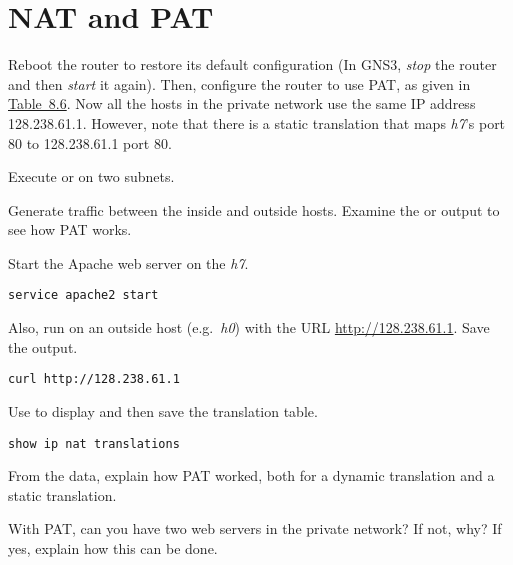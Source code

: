 \documentclass{../UTNetLab}
\begin{document}
\section{NAT and PAT}
Reboot the router to restore its default configuration (In GNS3, \textit{stop} the router and then \textit{start} it again).
Then, configure the router to use PAT, as given in \hyperref[tab:8.6]{Table~8.6}.
Now all the hosts in the private network use the same IP address 128.238.61.1.
However, note that there is a static translation that maps \textit{h7}’s port 80 to 128.238.61.1 port 80.

Execute  or  on two subnets.

Generate traffic between the inside and outside hosts.
Examine the  or  output to see how PAT works.

Start the Apache web server on the \textit{h7}.

\begin{lstlisting}
service apache2 start
\end{lstlisting}

Also, run  on an outside host (e.g.\ \textit{h0}) with the URL \url{http://128.238.61.1}.
Save the  output.

\begin{lstlisting}
curl http://128.238.61.1
\end{lstlisting}

Use  to display and then save the translation table.

\begin{lstlisting}[language=cisco, frame=trBL]
show ip nat translations
\end{lstlisting}

\begin{report}
    \item From the  data, explain how PAT worked, both for a dynamic translation and a static translation.

    \item With PAT, can you have two web servers in the private network?
    If not, why?
    If yes, explain how this can be done.
\end{report}
\end{document}
